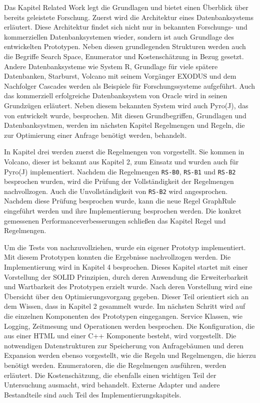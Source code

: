Das Kapitel Related Work legt die Grundlagen und bietet einen Überblick über bereits geleistete Forschung. Zuerst wird die Architektur eines Datenbanksystems erläutert. Diese Architektur findet sich nicht nur in bekannten Forschungs- und kommerziellen Datenbanksystemen wieder, sondern ist auch Grundlage des entwickelten Prototypen. Neben diesen grundlegenden Strukturen werden auch die Begriffe Search Space, Enumerator und Kostenschätzung in Bezug gesetzt. Andere Datenbanksysteme wie System R, Grundlage für viele spätere Datenbanken, Starburst, Volcano mit seinem Vorgänger EXODUS und dem Nachfolger Cascades werden als Beispiele für Forschungssysteme aufgeführt. Auch das kommerziell erfolgreiche Datenbanksystem von Oracle wird in seinen Grundzügen erläutert. Neben diesem bekannten System wird auch Pyro(J), das von \cite{roy2001multi} entwickelt wurde, besprochen. Mit diesen Grundbegriffen, Grundlagen und Datenbanksystmen, werden im nächsten Kapitel Regelmengen und Regeln, die zur Optimierung einer Anfrage benötigt werden, behandelt.

In Kapitel drei werden zuerst die Regelmengen von \cite{pellenkoft1997complexity} vorgestellt. Sie kommen in Volcano, dieser ist bekannt aus Kapitel 2, zum Einsatz und wurden auch für Pyro(J) implementiert. Nachdem die Regelmengen \texttt{RS-B0}, \texttt{RS-B1} und \texttt{RS-B2} besprochen wurden, wird die Prüfung der Vollständigkeit der Regelmengen nachvollzogen. Auch die Unvollständigkeit von \texttt{RS-B2} wird angesprochen. Nachdem diese Prüfung besprochen wurde, kann die neue Regel GraphRule eingeführt werden und ihre Implementierung besprochen werden. Die konkret gemessenen Performanceverbesserungen schließen das Kapitel Regel und Regelmengen.



Um die Tests von \cite{shanbhag2014optimizing} nachzuvollziehen, wurde ein eigener Prototyp implementiert. Mit diesem Prototypen konnten die Ergebnisse nachvollzogen werden. Die Implementierung wird in Kapitel 4 besprochen. Dieses Kapitel startet mit einer Vorstellung der SOLID Prinzipien, durch deren Anwendung die Erweiterbarkeit und Wartbarkeit des Prototypen erzielt wurde. Nach deren Vorstellung wird eine Übersicht über den Optimierungsvorgang gegeben. Dieser Teil orientiert sich an dem Wissen, dass in Kapitel 2 gesammelt wurde. Im nächsten Schritt wird auf die einzelnen Komponenten des Prototypen eingegangen. Service Klassen, wie Logging, Zeitmesung und Operationen werden besprochen. Die Konfiguration, die aus einer HTML und einer C++ Komponente besteht, wird vorgestellt. Die notwendigen Datenstrukturen zur Speicherung von Anfragebäumen und deren Expansion werden ebenso vorgestellt, wie die Regeln und Regelmengen, die hierzu benötigt werden. Enumeratoren, die die Regelmengen ausführen, werden erläutert. Die Kostenschätzung, die ebenfalls einen wichtigen Teil der Untersuchung ausmacht, wird behandelt. Externe Adapter und andere Bestandteile sind auch Teil des Implementierungskapitels.


